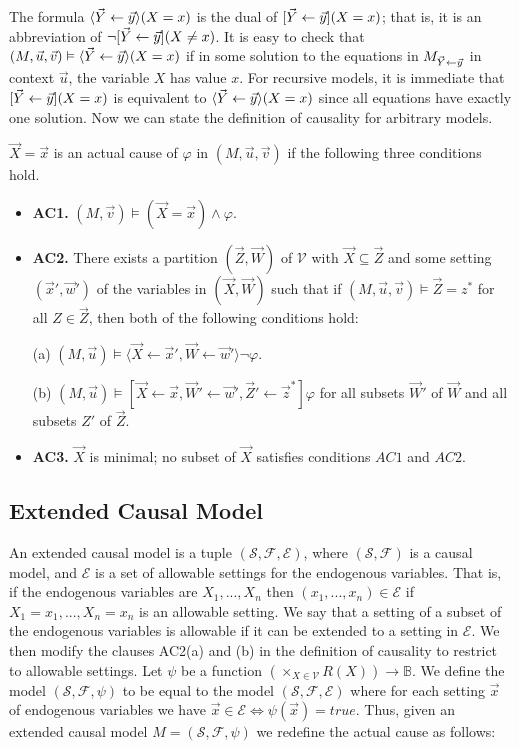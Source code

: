 The formula $\langle \vec Y \leftarrow \vec y \rangle(X=x)$ is the dual
of $[\vec Y \leftarrow \vec y](X=x)$; that is, it is an abbreviation of
$\neg [\vec Y \leftarrow \vec y](X \neq x)$.
It is easy to check that
$(M,\vec u, \vec v) \vDash \langle \vec Y \leftarrow \vec y \rangle(X=x)$
if in some solution to the equations in $M_{\vec Y \leftarrow \vec y}$ in
context $\vec u$, the variable $X$ has value $x$.
For recursive models, it is immediate that
$[\vec Y \leftarrow \vec y](X = x)$ is equivalent to
$\langle \vec Y \leftarrow \vec y \rangle(X=x)$ since all equations
have exactly one solution.
Now we can state the definition of causality for arbitrary models.
\begin{definition}
    $\vec X = \vec x$ is an actual cause of $\varphi$ in
    $(M,\vec u, \vec v) $ if the following three conditions hold.

    \begin{itemize}
        \item  \textbf{AC1.} $(M,\vec v)\models (\vec X = \vec x) \wedge \varphi$.
        \item  \textbf{AC2. }There exists a partition $(\vec Z, \vec W)$ of $\mathcal{V}$ with $\vec X \subseteq \vec Z$ and some setting $(\vec x',\vec w')$ of the variables in $(\vec X,\vec W)$ such that if $(M,\vec u, \vec v)\models \vec Z = z^*$ for all $Z\in \vec Z$, then both of the following conditions hold:

              (a) $(M,\vec u)\models \langle \vec X \leftarrow \vec x', \vec W \leftarrow \vec w' \rangle \neg \varphi$.

              (b) $(M,\vec u)\models[\vec X\leftarrow \vec x, \vec W' \leftarrow \vec w', \vec Z'\leftarrow \vec z^*]\varphi$ for all subsets $\vec W'$ of $\vec W$ and all subsets $Z'$ of $\vec Z$.

        \item  \textbf{AC3.} $\vec X$ is minimal; no subset of $\vec X$ satisfies conditions $AC1$ and $AC2$.
    \end{itemize}
\end{definition}

\subsection{Extended Causal Model}
An extended causal model is a tuple $(\mathcal{S},\mathcal{F},
    \mathcal{E})$, where $(\mathcal{S},\mathcal{F})$ is a causal model, and $\mathcal{E}$ is a set of allowable settings for the endogenous variables.
That is, if the endogenous variables are $X_1,...,X_n$ then
$(x_1,...,x_n) \in \mathcal{E}$ if $X_1 = x_1, ..., X_n=x_n$ is an
allowable setting.
We say that a setting of a subset of the endogenous variables is allowable if it can be extended to a setting in $\mathcal{E}$.
We then modify the clauses AC2(a) and (b) in the definition of causality to restrict to allowable settings.
Let $\psi$ be a function $(\times_{X \in \mathcal{V}}R(X))\rightarrow \mathbb{B}$.
We define the model $(\mathcal{S},\mathcal{F},\psi)$ to be equal
to the model $(\mathcal{S},\mathcal{F},\mathcal{E})$ where
for each setting $\vec x$ of endogenous variables we have $\vec x \in \mathcal{E} \iff \psi(\vec x) = true$.
Thus, given an extended causal model $M = (\mathcal{S},\mathcal{F},\psi)$ we redefine the actual cause as follows:

